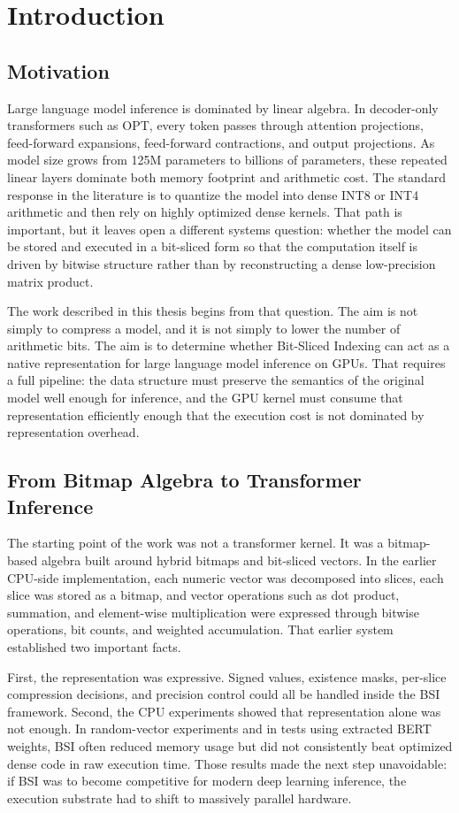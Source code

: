 \chapter{Introduction}

\section{Motivation}
Large language model inference is dominated by linear algebra. In decoder-only transformers such as OPT, every token passes through attention projections, feed-forward expansions, feed-forward contractions, and output projections. As model size grows from 125M parameters to billions of parameters, these repeated linear layers dominate both memory footprint and arithmetic cost. The standard response in the literature is to quantize the model into dense INT8 or INT4 arithmetic and then rely on highly optimized dense kernels. That path is important, but it leaves open a different systems question: whether the model can be stored and executed in a bit-sliced form so that the computation itself is driven by bitwise structure rather than by reconstructing a dense low-precision matrix product.

The work described in this thesis begins from that question. The aim is not simply to compress a model, and it is not simply to lower the number of arithmetic bits. The aim is to determine whether Bit-Sliced Indexing can act as a native representation for large language model inference on GPUs. That requires a full pipeline: the data structure must preserve the semantics of the original model well enough for inference, and the GPU kernel must consume that representation efficiently enough that the execution cost is not dominated by representation overhead.

\section{From Bitmap Algebra to Transformer Inference}
The starting point of the work was not a transformer kernel. It was a bitmap-based algebra built around hybrid bitmaps and bit-sliced vectors. In the earlier CPU-side implementation, each numeric vector was decomposed into slices, each slice was stored as a bitmap, and vector operations such as dot product, summation, and element-wise multiplication were expressed through bitwise operations, bit counts, and weighted accumulation. That earlier system established two important facts.

First, the representation was expressive. Signed values, existence masks, per-slice compression decisions, and precision control could all be handled inside the BSI framework. Second, the CPU experiments showed that representation alone was not enough. In random-vector experiments and in tests using extracted BERT weights, BSI often reduced memory usage but did not consistently beat optimized dense code in raw execution time. Those results made the next step unavoidable: if BSI was to become competitive for modern deep learning inference, the execution substrate had to shift to massively parallel hardware.

